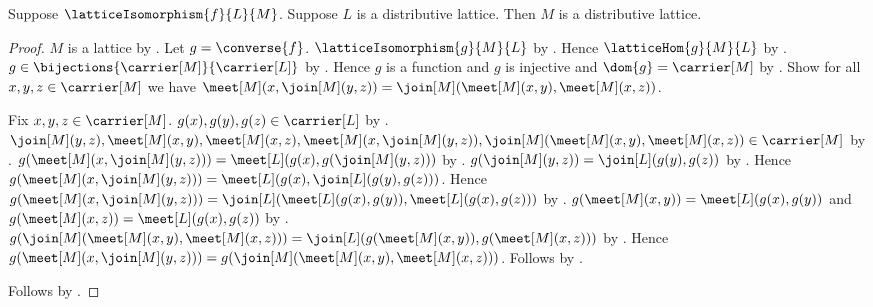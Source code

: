 \begin{theorem}\label{lattice_isomorphism_transfers_distributivity}
    Suppose $\latticeIsomorphism{f}{L}{M}$.
    Suppose $L$ is a distributive lattice.
    Then $M$ is a distributive lattice.
\end{theorem}
\begin{proof}
    $M$ is a lattice by
        .
    Let $g=\converse{f}$.
    $\latticeIsomorphism{g}{M}{L}$ by
        .
    Hence $\latticeHom{g}{M}{L}$ by
        .
    $g\in\bijections{\carrier[M]}{\carrier[L]}$ by
        .
    Hence $g$ is a function and $g$ is injective and
        $\dom{g}=\carrier[M]$ by
        .
    Show for all $x,y,z\in\carrier[M]$ we have
        $\meet[M](x,\join[M](y,z))
            =\join[M](\meet[M](x,y),\meet[M](x,z))$.
    \begin{subproof}
        Fix $x,y,z\in\carrier[M]$.
        $g(x),g(y),g(z)\in\carrier[L]$ by
            .
        $\join[M](y,z),\meet[M](x,y),\meet[M](x,z),
            \meet[M](x,\join[M](y,z)),
            \join[M](\meet[M](x,y),\meet[M](x,z))
            \in\carrier[M]$ by
            .
        $g(\meet[M](x,\join[M](y,z)))
            =\meet[L](g(x),g(\join[M](y,z)))$ by
            .
        $g(\join[M](y,z))=\join[L](g(y),g(z))$ by
            .
        Hence $g(\meet[M](x,\join[M](y,z)))
            =\meet[L](g(x),\join[L](g(y),g(z)))$.
        Hence $g(\meet[M](x,\join[M](y,z)))
            =\join[L](\meet[L](g(x),g(y)),\meet[L](g(x),g(z)))$ by
            .
        $g(\meet[M](x,y))=\meet[L](g(x),g(y))$ and
            $g(\meet[M](x,z))=\meet[L](g(x),g(z))$ by
            .
        $g(\join[M](\meet[M](x,y),\meet[M](x,z)))
            =\join[L]
                (g(\meet[M](x,y)),g(\meet[M](x,z)))$ by
            .
        Hence $g(\meet[M](x,\join[M](y,z)))
            =g(\join[M](\meet[M](x,y),\meet[M](x,z)))$.
        Follows by .
    \end{subproof}
    Follows by .
\end{proof}

